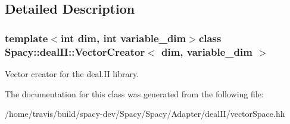 \subsection{Detailed Description}
\subsubsection*{template$<$int dim, int variable\-\_\-dim$>$class Spacy\-::deal\-I\-I\-::\-Vector\-Creator$<$ dim, variable\-\_\-dim $>$}

Vector creator for the deal.\-I\-I library. 

The documentation for this class was generated from the following file\-:\begin{DoxyCompactItemize}
\item 
/home/travis/build/spacy-\/dev/\-Spacy/\-Spacy/\-Adapter/deal\-I\-I/vector\-Space.\-hh\end{DoxyCompactItemize}
